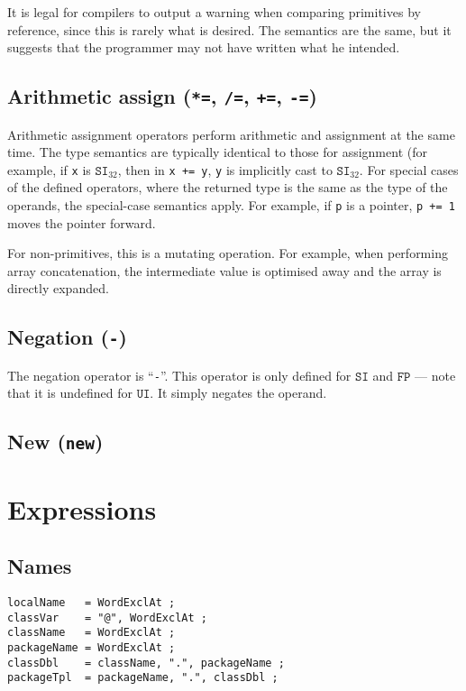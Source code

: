 \documentclass{article}
\newcommand{\R}[1]{\mathtt{#1}}
\begin{document}
It is legal for compilers to output a warning when comparing primitives
by reference, since this is rarely what is desired. The semantics are the
same, but it suggests that the programmer may not have written what he
intended.

\subsection{Arithmetic assign (\texttt{*=}, \texttt{/=}, \texttt{+=},
  \texttt{-=})}
\label{sub:operators:arithas}
Arithmetic assignment operators perform arithmetic and assignment at the same
time. The type semantics are typically identical to those for assignment
(for example, if \texttt{x} is $\R{SI}_{32}$, then in
\texttt{x~+=~y}, \texttt{y} is implicitly cast to $\R{SI}_{32}$. For special
cases of the defined operators, where the returned type is the same as the
type of the operands, the special-case semantics apply. For example, if
\texttt{p} is a pointer, \texttt{p~+=~1} moves the pointer forward.

For non-primitives, this is a mutating operation. For example, when performing
array concatenation, the intermediate value is optimised away and the
array is directly expanded.

\subsection{Negation (\texttt{-})}
\label{sub:operators:neg}
The negation operator is ``\texttt{-}''. This operator is only defined for
$\R{SI}$ and $\R{FP}$ --- note that it is undefined for $\R{UI}$. It simply
negates the operand.

\subsection{New (\texttt{new})}
\label{sub:operators:new}

\section{Expressions}
\label{sec:expressions}

\subsection{Names}
\label{sub:expressions:names}
\begin{verbatim}
localName   = WordExclAt ;
classVar    = "@", WordExclAt ;
className   = WordExclAt ;
packageName = WordExclAt ;
classDbl    = className, ".", packageName ;
packageTpl  = packageName, ".", classDbl ;
\end{verbatim}
\end{document}
